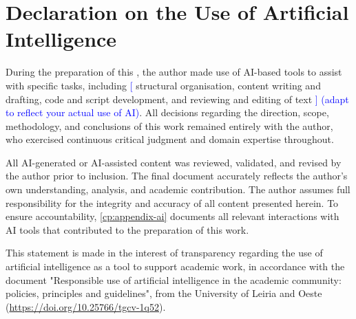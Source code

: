 {{    }{%
        \chapter*{Declaration on the Use of Artificial Intelligence}


        \vspace{2em}

            During the preparation of this \GetThesisType, the author made use of AI-based tools to assist with specific tasks, including \textcolor{blue}{[} structural organisation, content writing and drafting, code and script development, and reviewing and editing of text \textcolor{blue}{] (adapt to reflect your actual use of AI)}. All decisions regarding the direction, scope, methodology, and conclusions of this work remained entirely with the author, who exercised continuous critical judgment and domain expertise throughout.

            All AI-generated or AI-assisted content was reviewed, validated, and revised by the author prior to inclusion. The final document accurately reflects the author's own understanding, analysis, and academic contribution. The author assumes full responsibility for the integrity and accuracy of all content presented herein. To ensure accountability, \autoref{cp:appendix-ai} documents all relevant interactions with AI tools that contributed to the preparation of this work.

            This statement is made in the interest of transparency regarding the use of artificial intelligence as a tool to support academic work, in accordance with the document "Responsible use of artificial intelligence in the academic community: policies, principles and guidelines", from the University of Leiria and Oeste (\url{https://doi.org/10.25766/tgcv-1q52}).
    }

    \MediaOptionLogicBlank
}{}
